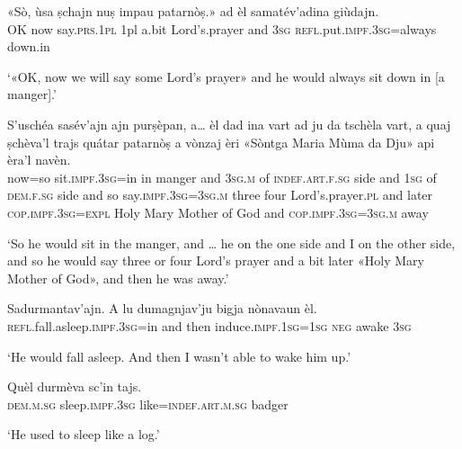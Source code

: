 \begin{linenumbers}
\gll  «Sò, ùsa ṣchajn nuṣ impau patarnòṣ.» ad èl samatév’adina giùdajn.  \\
OK now say.\textsc{prs.1pl} 1pl a.bit  Lord’s.prayer and \textsc{3sg} \textsc{refl}.put.\textsc{impf.3sg=}always down.in  \\
\end{linenumbers}
\medskip
\glt `«OK, now we will say some Lord’s prayer» and he would always sit down in [a manger].'
\medskip

\begin{linenumbers}
\gll S'uschéa sasév’ajn ajn purṣèpan, a… èl dad ina vart ad ju da tschèla vart, a quaj ṣchèva’l trajs quátar  patarnòṣ a vònzaj èri «Sòntga Maria Mùma da Dju» api èra’l navèn.\\ %
now=so sit.\textsc{impf.3sg=}in in  manger and  \textsc{3sg.m} of \textsc{indef.art.f.sg} side and  \textsc{1sg} of \textsc{dem.f.sg} side and so say.\textsc{impf.3sg=3sg.m} three four Lord’s.prayer.\textsc{pl} and later \textsc{cop.impf.3sg=expl} Holy Mary Mother of God and \textsc{cop.impf.3sg=3sg.m} away\\
\end{linenumbers}
\medskip
\glt `So he would sit in the manger, and … he on the one side and I on the other side, and so he would say three or four Lord’s prayer and a bit later «Holy Mary Mother of God», and then he was away.'
\medskip

\begin{linenumbers}
\gll  Sadurmantav’ajn. A lu dumagnjav’ju bigja nònavaun èl.  \\
 \textsc{refl}.fall.asleep.\textsc{impf.3sg=}in and then induce.\textsc{impf.1sg=1sg} \textsc{neg} awake  \textsc{3sg}    \\
\end{linenumbers}
\medskip
\glt `He would fall asleep. And  then I wasn't able to wake him up.'
\medskip

\begin{linenumbers}
\gll  Quèl durmèva sc’in tajs.  \\
 \textsc{dem.m.sg} sleep.\textsc{impf.3sg} like=\textsc{indef.art.m.sg} badger \\
\end{linenumbers}
\medskip
\glt `He used to sleep like a log.'
\medskip

